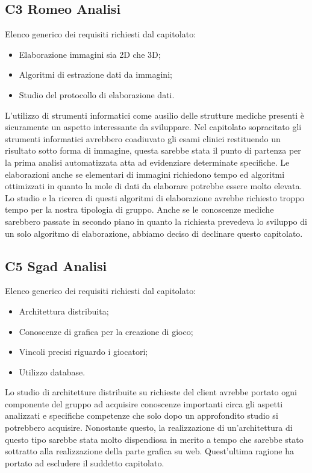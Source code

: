 \subsection{C3 Romeo Analisi}
Elenco generico dei requisiti richiesti dal capitolato:
\begin{itemize} 
\item Elaborazione immagini sia 2D che 3D;
\item Algoritmi di estrazione dati da immagini;
\item Studio del protocollo di elaborazione dati.
\end{itemize}
L'utilizzo di strumenti informatici come ausilio delle strutture mediche presenti è sicuramente un aspetto interessante da sviluppare. Nel capitolato sopracitato gli strumenti informatici avrebbero coadiuvato gli esami clinici restituendo un risultato sotto forma di immagine, questa sarebbe stata il punto di partenza per la prima analisi automatizzata atta ad evidenziare determinate specifiche. Le elaborazioni anche se elementari di immagini richiedono tempo ed algoritmi ottimizzati in quanto la mole di dati da elaborare potrebbe essere molto elevata. Lo studio e la ricerca di questi algoritmi di elaborazione avrebbe richiesto troppo tempo per la nostra tipologia di gruppo. Anche se le conoscenze mediche sarebbero passate in secondo piano in quanto la richiesta prevedeva lo sviluppo di un solo algoritmo di elaborazione, abbiamo deciso di declinare questo capitolato.   \\
\subsection{C5 Sgad Analisi}
Elenco generico dei requisiti richiesti dal capitolato:
\begin{itemize} 
\item Architettura distribuita;
\item Conoscenze di grafica per la creazione di gioco;
\item Vincoli precisi riguardo i giocatori;
\item Utilizzo database.
\end{itemize}
Lo studio di architetture distribuite su richieste del client avrebbe portato ogni componente del gruppo ad acquisire conoscenze importanti circa gli aspetti analizzati e specifiche competenze che solo dopo un approfondito studio si potrebbero acquisire. Nonostante questo, la realizzazione di un'architettura di questo tipo sarebbe stata molto dispendiosa in merito a tempo che sarebbe stato sottratto alla realizzazione della parte grafica su web. Quest'ultima ragione ha portato ad escludere il suddetto capitolato.\\